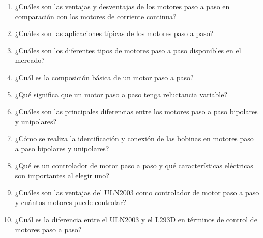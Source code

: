 \documentclass[../main]{subfiles}
\begin{document}
\begin{enumerate}
  \item ¿Cuáles son las ventajas y desventajas de los motores paso a paso en comparación con los motores de corriente continua?
  \item ¿Cuáles son las aplicaciones típicas de los motores paso a paso?
  \item ¿Cuáles son los diferentes tipos de motores paso a paso disponibles en el mercado?
  \item ¿Cuál es la composición básica de un motor paso a paso?
  \item ¿Qué significa que un motor paso a paso tenga reluctancia variable?
  \item ¿Cuáles son las principales diferencias entre los motores paso a paso bipolares y unipolares?
  \item ¿Cómo se realiza la identificación y conexión de las bobinas en motores paso a paso bipolares y unipolares?
  \item ¿Qué es un controlador de motor paso a paso y qué características eléctricas son importantes al elegir uno?
  \item ¿Cuáles son las ventajas del ULN2003 como controlador de motor paso a paso y cuántos motores puede controlar?
  \item ¿Cuál es la diferencia entre el ULN2003 y el L293D en términos de control de motores paso a paso?
\end{enumerate}
\end{document}
